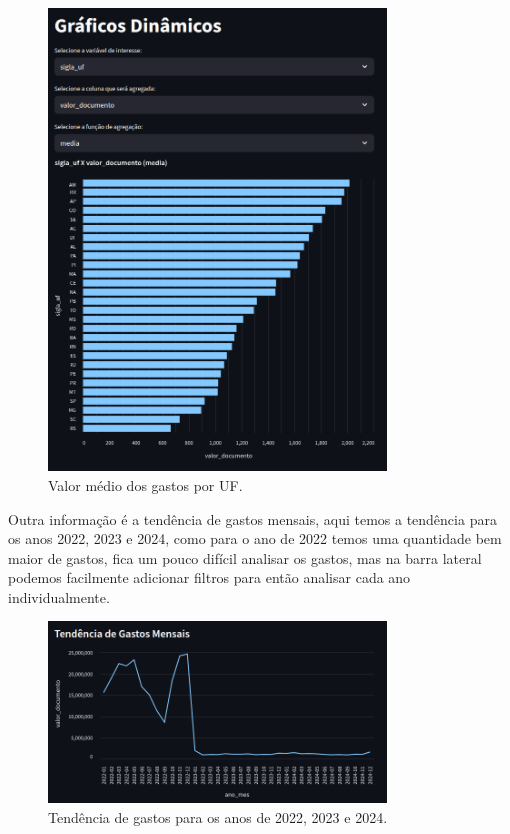 \documentclass[12pt, a4paper]{article}
\begin{document}
\begin{figure}[!htbp]
	\centering
	\includegraphics[width=0.8\textwidth]{assets/2_plot8.png}
	\caption{Valor médio dos gastos por UF.}
	\label{fig:criacao_postgresql}
\end{figure}

Outra informação é a tendência de gastos mensais, aqui temos a tendência para os anos 2022, 2023 e 2024, como para o ano de 2022 temos uma quantidade bem maior de gastos, fica um pouco difícil analisar os gastos, mas na barra lateral podemos facilmente adicionar filtros para então analisar cada ano individualmente.

\begin{figure}[!htbp]
	\centering
	\includegraphics[width=0.8\textwidth]{assets/2_plot9.png}
	\caption{Tendência de gastos para os anos de 2022, 2023 e 2024.}
	\label{fig:tendencia de gastos}
\end{figure}
\end{document}
